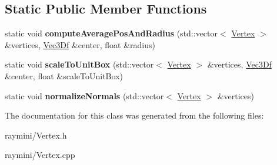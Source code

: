 \subsection*{Static Public Member Functions}
\begin{DoxyCompactItemize}
\item 
\hypertarget{class_vertex_ab7d3c50b63d26fcaa3b473ff9635e8d1}{
static void {\bfseries computeAveragePosAndRadius} (std::vector$<$ \hyperlink{class_vertex}{Vertex} $>$ \&vertices, \hyperlink{class_vec3_d}{Vec3Df} \&center, float \&radius)}
\label{class_vertex_ab7d3c50b63d26fcaa3b473ff9635e8d1}

\item 
\hypertarget{class_vertex_a3d88aa3bcab9a1e745694725a65214bc}{
static void {\bfseries scaleToUnitBox} (std::vector$<$ \hyperlink{class_vertex}{Vertex} $>$ \&vertices, \hyperlink{class_vec3_d}{Vec3Df} \&center, float \&scaleToUnitBox)}
\label{class_vertex_a3d88aa3bcab9a1e745694725a65214bc}

\item 
\hypertarget{class_vertex_ac71b7a76430abbb2ce0ae8d4af706881}{
static void {\bfseries normalizeNormals} (std::vector$<$ \hyperlink{class_vertex}{Vertex} $>$ \&vertices)}
\label{class_vertex_ac71b7a76430abbb2ce0ae8d4af706881}

\end{DoxyCompactItemize}


The documentation for this class was generated from the following files:\begin{DoxyCompactItemize}
\item 
raymini/Vertex.h\item 
raymini/Vertex.cpp\end{DoxyCompactItemize}
